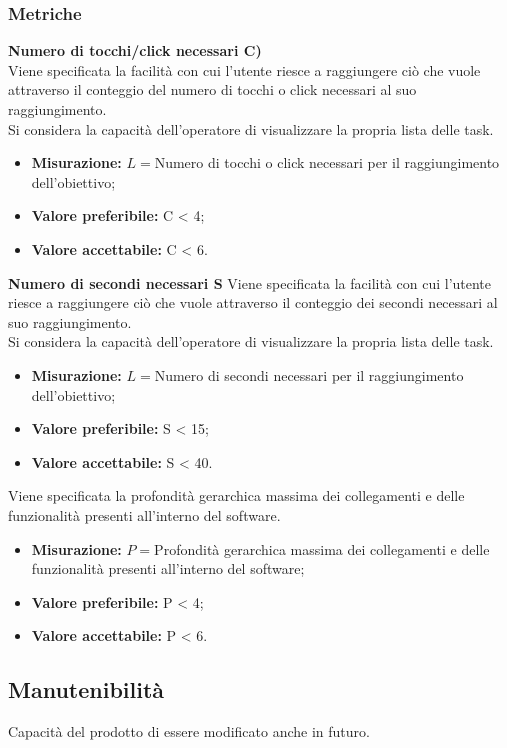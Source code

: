 \subsubsection{Metriche}
\textbf{Numero di tocchi/click necessari C)}\\
Viene specificata la facilità con cui l'utente riesce a raggiungere ciò che vuole attraverso il conteggio del numero di tocchi o click necessari al suo raggiungimento.\\
Si considera la capacità dell'operatore di visualizzare la propria lista delle task.
\begin{itemize}
	\item \textbf{Misurazione:} $L = $Numero di tocchi o click necessari per il raggiungimento dell'obiettivo;
	\item \textbf{Valore preferibile:} C < 4;
	\item \textbf{Valore accettabile:} C < 6.
\end{itemize}
\textbf{Numero di secondi necessari S}
Viene specificata la facilità con cui l'utente riesce a raggiungere ciò che vuole attraverso il conteggio dei secondi necessari al suo raggiungimento.\\
Si considera la capacità dell'operatore di visualizzare la propria lista delle task.
\begin{itemize}
	\item \textbf{Misurazione:} $L = $Numero di secondi necessari per il raggiungimento dell'obiettivo;
	\item \textbf{Valore preferibile:} S < 15;
	\item \textbf{Valore accettabile:} S < 40.
\end{itemize}
Viene specificata la profondità gerarchica massima dei collegamenti e delle funzionalità presenti all'interno del software.
\begin{itemize}
	\item \textbf{Misurazione:} $P = $Profondità gerarchica massima dei collegamenti e delle funzionalità presenti all'interno del software;
	\item \textbf{Valore preferibile:} P < 4;
	\item \textbf{Valore accettabile:} P < 6.
\end{itemize}
\subsection{Manutenibilità}
Capacità del prodotto di essere modificato anche in futuro.
